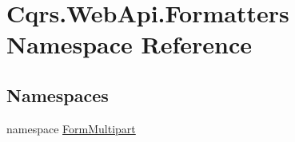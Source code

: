 \hypertarget{namespaceCqrs_1_1WebApi_1_1Formatters}{}\section{Cqrs.\+Web\+Api.\+Formatters Namespace Reference}
\label{namespaceCqrs_1_1WebApi_1_1Formatters}
\subsection*{Namespaces}
\begin{DoxyCompactItemize}
\item 
namespace \hyperlink{namespaceCqrs_1_1WebApi_1_1Formatters_1_1FormMultipart}{Form\+Multipart}
\end{DoxyCompactItemize}
